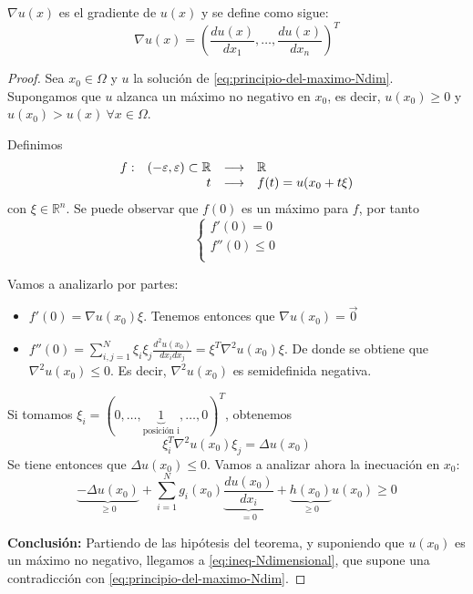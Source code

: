 $\nabla u(x)$ es el gradiente de $u(x)$ y se define como sigue:
$$\nabla u(x) = \left(\frac{du(x)}{dx_1}, \hdots, \frac{du(x)}{dx_n}\right)^T$$
\begin{proof}
Sea $x_0\in \Omega$ y $u$ la solución de \eqref{eq:principio-del-maximo-Ndim}. Supongamos que $u$ alzanca un máximo no negativo en $x_0$, es decir, $u(x_0) \ge 0$ y $u(x_0) > u(x)\ \forall x \in \Omega$.

Definimos 
\begin{equation*}
\begin{array}{l r l l}
f: & (-\varepsilon, \varepsilon) \subset\mathbb{R} & \longrightarrow  & \mathbb{R}\\
& t & \longrightarrow & f(t) = u(x_0+t\xi)\\
\end{array}
\end{equation*}
con $\xi\in\mathbb{R}^n$.
Se puede observar que $f(0)$ es un máximo para $f$, por tanto
\begin{equation}
\left\{
\begin{array}{l}
f'(0) = 0\\
f''(0) \le 0\\
\end{array}
\right.
\end{equation}

Vamos a analizarlo por partes:
\begin{itemize}
\item $f'(0) = \nabla u(x_0)\xi$. Tenemos entonces que $\nabla u(x_0) = \vec{0}$
\item $f''(0) = \sum_{i,j=1}^N \xi_i\xi_j\frac{d^2u(x_0)}{dx_idx_j} = \xi^T\nabla^2u(x_0)\xi$. De donde se obtiene que $\nabla^2u(x_0) \le 0$. Es decir, $\nabla^2u(x_0)$ es semidefinida negativa.
\end{itemize}

Si tomamos $\xi_i = (0,\hdots, \underbrace{1}_{\text{posición i}}, \hdots, 0)^T$, obtenemos
$$\xi_i^T\nabla^2u(x_0)\xi_j = \Delta u(x_0)$$
Se tiene entonces que $\Delta u(x_0) \leq 0$.
Vamos a analizar ahora la inecuación en $x_0$:
\begin{equation}\label{eq:ineq-Ndimensional}
\underbrace{-\Delta u(x_0)}_{\ge 0} + \sum_{i=1}^N g_i(x_0)\underbrace{\frac{du(x_0)}{dx_i}}_{=0}+\underbrace{h(x_0)}_{\ge 0}u(x_0) \ge 0
\end{equation}

\noindent\textbf{Conclusión:}
Partiendo de las hipótesis del teorema, y suponiendo que $u(x_0)$ es un máximo no negativo, llegamos a \eqref{eq:ineq-Ndimensional}, que supone una contradicción con \eqref{eq:principio-del-maximo-Ndim}.
\end{proof}

